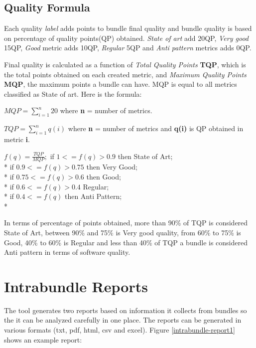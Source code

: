 \subsection{Quality Formula}

Each quality \emph{label} adds points to bundle final quality and bundle quality is based on percentage of quality points(QP) obtained. \emph{State of art} add 20QP, \emph{Very good} 15QP, \emph{Good} metric adds 10QP, \emph{Regular} 5QP and \emph{Anti pattern} metrics adds 0QP. 

Final quality is calculated as a function of \emph{Total Quality Points} \textbf{TQP}, which is the total points obtained on each created metric, and \emph{Maximum Quality Points} \textbf{MQP}, the maximum points a bundle can have. MQP is equal to all metrics classified as State of art. Here is the formula:\newline    

\(MQP = \sum_{i=1}^{n} 20 \) where \textbf{n} = number of metrics. \newline

\(TQP = \sum_{i=1}^{n} q(i) \) where \textbf{n} = number of metrics and \textbf{q(i)} is QP obtained in metric \textbf{i}. \newline

 
\(
f(q) = \frac{TQP}{MQP};
\)
\newline
\newline
 if \( 1 <= f(q) > 0.9 \) then State of Art; \\*
 if \( 0.9 <= f(q) > 0.75 \) then Very Good; \\*
 if \( 0.75 <= f(q) > 0.6 \) then Good; \\*
 if \( 0.6 <= f(q) > 0.4 \) Regular; \\*
 if \( 0.4 <= f(q) \) then Anti Pattern;\\*

In terms of percentage of points obtained, more than 90\% of TQP is considered State of Art, between 90\% and 75\% is Very good quality, from 60\% to 75\% is Good, 40\% to 60\% is Regular and less than 40\% of TQP a bundle is considered Anti pattern in terms of software quality. 


\section{Intrabundle Reports}
\label{sec:intrabundle-reports}
The tool generates two reports based on information it collects from bundles so the it can be analyzed carefully in one place. The reports can be generated in various formats (txt, pdf, html, csv and excel). Figure \ref{intrabundle-report1} shows an example report:  

